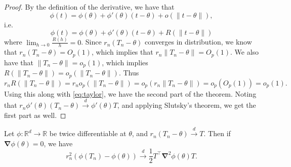 \begin{proof}
By the definition of the derivative, we have that
\[
\phi(t) = \phi(\theta) + \phi'(\theta)(t - \theta) + o(\|t - \theta\|),
\]
i.e.
\begin{equation}\label{eq:taylor}
\phi(t) = \phi(\theta) + \phi'(\theta)(t - \theta) + R(\|t - \theta\|)
\end{equation}
where $\lim_{h \to 0} \frac{R(h)}{h} = 0$. Since $r_n(T_n - \theta)$ converges in distribution, we know that $r_n(T_n - \theta) = O_p(1)$, which implies that $r_n \|T_n - \theta\| = O_p(1)$. We also have that $\|T_n - \theta\| = o_p(1)$, which implies $R(\|T_n - \theta\|) = o_p(\|T_n - \theta\|)$. Thus
\[
r_n R(\|T_n - \theta\|) = r_n o_p(\|T_n - \theta\|) = o_p(r_n \|T_n - \theta\|) = o_p(O_p(1)) = o_p(1).
\]
Using this along with \eqref{eq:taylor}, we have the second part of the theorem. Noting that $r_n \phi'(\theta)(T_n - \theta) \xrightarrow{d} \phi'(\theta) T$, and applying Slutsky's theorem, we get the first part as well.
\end{proof}

\begin{thm}
Let $\phi: \mathbb{R}^d \to \mathbb{R}$ be twice differentiable at $\theta$, and $r_n(T_n - \theta) \xrightarrow{d} T$. Then if $\boldsymbol{\nabla} \phi(\theta) = 0$, we have
\[
r_n^2(\phi(T_n) - \phi(\theta)) \xrightarrow{d} \frac{1}{2} T^\top \boldsymbol{\nabla}^2 \phi(\theta) T.
\]
\end{thm}


